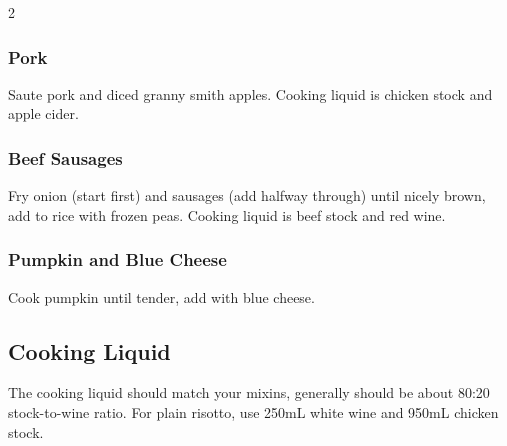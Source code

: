 \begin{multicols}{2}
  \subsubsection{Pork}
    Saute pork and diced granny smith apples. Cooking liquid is chicken stock and apple cider.

  \subsubsection{Beef Sausages}
    Fry onion (start first) and sausages (add halfway through) until nicely brown, add to rice with frozen peas. Cooking liquid is beef stock and red wine.

  \subsubsection{Pumpkin and Blue Cheese}
    Cook pumpkin until tender, add with blue cheese.

  \vfill\null

  \columnbreak

  \subsection{Cooking Liquid}
  The cooking liquid should match your mixins, generally should be about 80:20 stock-to-wine ratio. For plain risotto, use 250mL white wine and 950mL chicken stock.


\end{multicols}

